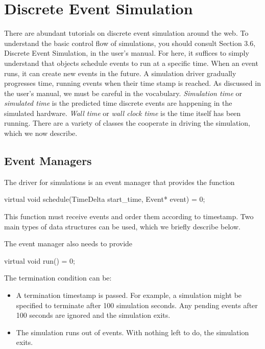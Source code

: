 

\chapter{Discrete Event Simulation}
\label{chapter:des}
There are abundant tutorials on discrete event simulation around the web.
To understand the basic control flow of \sstmacro simulations,
you should consult Section 3.6, Discrete Event Simulation, in the user's manual.
For here, it suffices to simply understand that objects schedule events to run at a specific time.
When an event runs, it can create new events in the future.
A simulation driver gradually progresses time, running events when their time stamp is reached.
As discussed in the user's manual, we must be careful in the vocabulary.
\emph{Simulation time} or \emph{simulated time} is the predicted time discrete events are happening in the simulated hardware.
\emph{Wall time} or \emph{wall clock time} is the time \sstmacro itself has been running.
There are a variety of classes the cooperate in driving the simulation, which we now describe.

\section{Event Managers}
\label{sec:eventManagers}
The driver for simulations is an event manager that provides the function

\begin{CppCode}
virtual void schedule(TimeDelta start_time, Event* event) = 0;
\end{CppCode}
This function must receive events and order them according to timestamp.
Two main types of data structures can be used, which we briefly describe below.

The event manager also needs to provide

\begin{CppCode}
virtual void run() = 0;
\end{CppCode}

The termination condition can be:
\begin{itemize}
\item A termination timestamp is passed.  For example, a simulation might be specified to terminate after 100 simulation seconds. 
Any pending events after 100 seconds are ignored and the simulation exits.
\item The simulation runs out of events.  With nothing left to do, the simulation exits.
\end{itemize}

